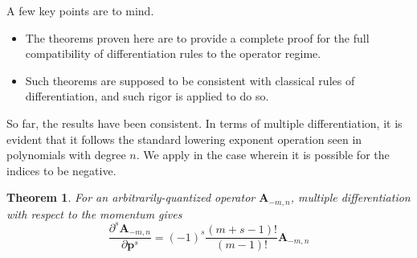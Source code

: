 \documentclass[a4paper]{article}
\newtheorem{theorem}{Theorem}[section]
\theoremstyle{definition}
\begin{document}
A few key points are to mind.
\begin{itemize}
	\item The theorems proven here are to provide a complete proof for the full compatibility of differentiation rules to the operator regime.
	\item Such theorems are supposed to be consistent with classical rules of differentiation, and such rigor is applied to do so.
\end{itemize}

So far, the results have been consistent. In terms of multiple differentiation, it is evident that it follows the standard lowering exponent operation seen in polynomials with degree $n$. We apply in the case wherein it is possible for the indices to be negative.

\begin{theorem}
	For an arbitrarily-quantized operator $\textbf{A}_{-m,n}$, multiple differentiation with respect to the momentum	gives
	\begin{equation}
		\frac{\partial^s\textbf{A}_{-m,n}}{\partial\textbf{p}^s}=(-1)^{s}\frac{(m+s-1)!}{(m-1)!}\textbf{A}_{-m,n}
	\end{equation}
\end{theorem}
\end{document}
